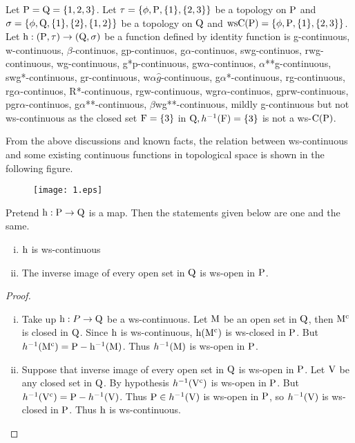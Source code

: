 \begin{exm}\label{exam3.2.13}
Let $\mathrm{P}=\mathrm{Q}= \{1, 2, 3\}$. Let $\tau = \{\phi, \mathrm{P}, \{1\}, \{2,3\}\}$ be a topology on $\mathrm{P}$ and $\sigma =\{\phi, \mathrm{Q}, \{1\},\{2\}, \{1,2\}\}$ be a topology on $\mathrm{Q}$ and $\mathrm{ws}\mathrm{C}(\mathrm{P})=\{\phi, \mathrm{P}, \{1\},\{2,3\}\}$. Let $\mathrm{h}: (\mathrm{P}, \tau )\to (\mathrm{Q}, \sigma)$ be a function defined by identity function is g-continuous, w-continuous, $\beta$-continuos, gp-continuos, g$\alpha$-continuos, swg-continuos, rwg-continuous, wg-continuous, g*p-continuous, gw$\alpha$-continuos, $\alpha${*}{*}g-continuous, swg*-continuous, gr-continuous, w$\alpha\hat{g}$-continuous, g$\alpha$*-continuous, rg-continuous, rg$\alpha$-continuos, R*-continuous, rgw-continuous, wgr$\alpha$-continuos, gprw-continuous, pgr$\alpha$-continuos, g$\alpha${*}{*}-continuous, $\beta$wg{*}{*}-continuous, mildly g-continuous but not ws-continuous as the closed set $\mathrm{F}=\{3\}$ in $\mathrm{Q}, h^{-1} (\mathrm{F})=\{3\}$ is not a ws-$\mathrm{C}(\mathrm{P})$.
\end{exm}

\begin{rem}\label{rem3.2.14} 
From the above discussions and known facts, the relation between ws-continuous and some existing continuous functions in topological space is shown in the following figure.
\begin{figure}[!htb]
\centering
\texttt{[image: 1.eps]}
\end{figure}
\end{rem}

\begin{thm}\label{thm3.2.15}
Pretend $\mathrm{h}: \mathrm{P}\to \mathrm{Q}$ is a map. Then the statements given below are one and the same.
\begin{enumerate}[(i)]
\item $\mathrm{h}$ is ws-continuous
\item The inverse image of every open set in $\mathrm{Q}$ is ws-open in $\mathrm{P}$.
\end{enumerate}
\end{thm}

\begin{proof}
\begin{enumerate}[(i)]
\item Take up $\mathrm{h}: P\to \mathrm{Q}$ be a ws-continuous. Let $\mathrm{M}$ be an open set in $\mathrm{Q}$, then $\mathrm{M}^{\text{c}}$ is closed in $\mathrm{Q}$. Since $\mathrm{h}$ is ws-continuous, $\mathrm{h}(\mathrm{M}^{\text{c}})$ is ws-closed in $\mathrm{P}$. But $h^{-1}(\mathrm{M}^{\text{c}})=\mathrm{P}- \mathrm{h}^{-1}(\mathrm{M})$. Thus $h^{-1}(\mathrm{M})$ is ws-open in $\mathrm{P}$.

\item Suppose that inverse image of every open set in $\mathrm{Q}$ is ws-open in $\mathrm{P}$. Let $\mathrm{V}$ be any closed set in $\mathrm{Q}$. By hypothesis $h^{-1} (\mathrm{V}^{\text{c}})$ is ws-open in $\mathrm{P}$. But $h^{-1}(\mathrm{V}^{\text{c}}) = \mathrm{P}-h^{-1}(\mathrm{V})$. Thus $\mathrm{P}\in h^{-1} (\mathrm{V})$ is ws-open in $\mathrm{P}$, so $h^{-1}(\mathrm{V})$ is ws-closed in $\mathrm{P}$. Thus $\mathrm{h}$ is ws-continuous.
\end{enumerate}
\end{proof}

